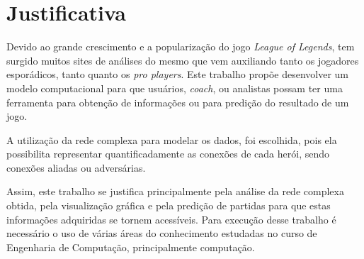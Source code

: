 \section{Justificativa}
Devido ao grande crescimento e a popularização do jogo \textit{League of Legends}, tem surgido muitos sites de análises do mesmo que vem auxiliando tanto os jogadores esporádicos, tanto quanto os \textit{pro players}.
Este trabalho propõe desenvolver um modelo computacional para que usuários, \textit{coach}, ou analistas possam ter uma ferramenta para obtenção de informações ou para predição do resultado de um jogo.

A utilização da rede complexa para modelar os dados, foi escolhida, pois ela possibilita representar quantificadamente as conexões de cada herói, sendo conexões aliadas ou adversárias.

Assim, este trabalho se justifica principalmente pela análise da rede complexa obtida, pela visualização gráfica e pela predição de partidas para que estas informações adquiridas se tornem acessíveis. 
Para execução desse trabalho é necessário o uso de várias áreas do conhecimento estudadas no curso de Engenharia de Computação, principalmente computação.